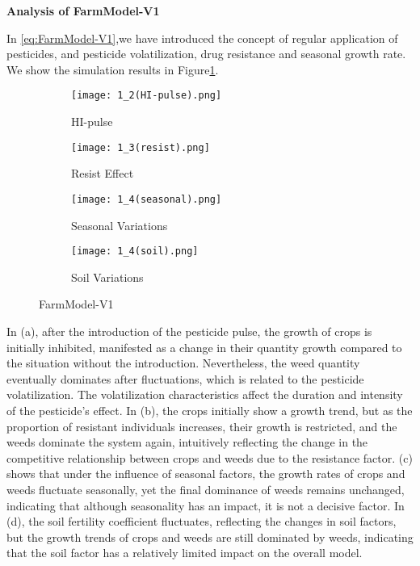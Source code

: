 \documentclass[12pt]{article}  %
\begin{document}
\noindent \textbf{Analysis of FarmModel-V1}

In \ref{eq:FarmModel-V1},we have introduced the concept of regular 
application of pesticides, and pesticide volatilization, drug resistance
and seasonal growth rate. We show the simulation results in 
Figure\ref{fig:FarmModel-V1}.

\begin{figure}[h]
    \centering
    \begin{subfigure}[b]{.4\textwidth}
        \texttt{[image: 1\_2(HI-pulse).png]}
        \caption{HI-pulse}
    \end{subfigure}
    \begin{subfigure}[b]{.4\textwidth}
    \texttt{[image: 1\_3(resist).png]}
    \caption{Resist Effect}
    \end{subfigure}
    \begin{subfigure}[b]{.4\textwidth}
    \texttt{[image: 1\_4(seasonal).png]}
    \caption{Seasonal Variations}
    \end{subfigure}
    \begin{subfigure}[b]{.4\textwidth}
        \texttt{[image: 1\_4(soil).png]}
        \caption{Soil Variations}
    \end{subfigure}
    \caption{FarmModel-V1}\label{fig:FarmModel-V1}
    \end{figure}

    In (a), after the introduction of the pesticide pulse, the growth of crops 
    is initially inhibited, manifested as a change in their quantity growth 
    compared to the situation without the introduction. Nevertheless, the weed 
    quantity eventually dominates after fluctuations, which is related to the 
    pesticide volatilization. 
    The volatilization characteristics affect the duration and intensity of 
    the pesticide's effect. In (b), the crops initially show a 
    growth trend, but as the proportion of resistant individuals increases, their 
    growth is restricted, and the weeds dominate the system again, intuitively 
    reflecting the change in the competitive relationship between crops and weeds
     due to the resistance factor. (c) shows that under the influence
      of seasonal factors, the growth rates of crops and weeds fluctuate seasonally,
       yet the final dominance of weeds remains unchanged, indicating that although 
       seasonality has an impact, it is not a decisive factor. In (d), 
       the soil fertility coefficient fluctuates, reflecting the changes in soil 
       factors, but the growth trends of crops and weeds are still dominated by 
       weeds, indicating that the soil factor has a relatively limited impact on 
       the overall model.
\end{document}
